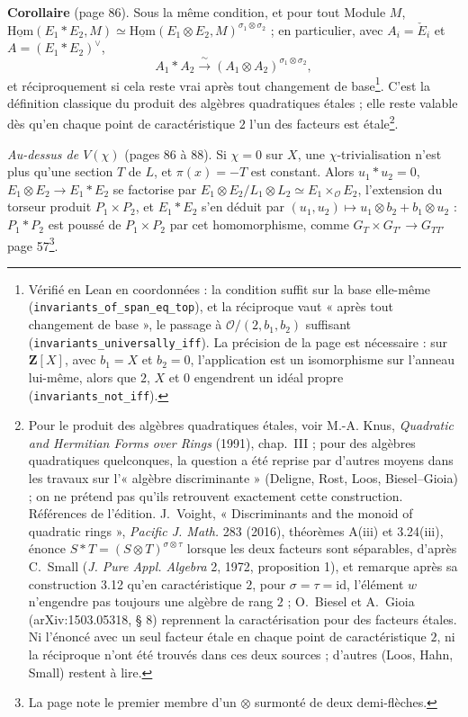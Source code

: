 \documentclass[11pt,a4paper]{article}
\begin{document}
\textbf{Corollaire} (page 86). Sous la même condition, et pour tout Module $M$,
$\underline{\mathrm{Hom}}(E_1 * E_2, M) \simeq \underline{\mathrm{Hom}}(E_1 \otimes
E_2, M)^{\sigma_1 \otimes \sigma_2}$ ; en particulier, avec $A_i = \check{E}_i$ et
$A = (E_1 * E_2)^{\vee}$,
\[
  A_1 * A_2 \xrightarrow{\ \sim\ } (A_1 \otimes A_2)^{\sigma_1 \otimes \sigma_2},
\]
et réciproquement si cela reste vrai après tout changement de base\footnote{Vérifié
en Lean en coordonnées : la condition suffit sur la base elle-même
(\texttt{invariants\_of\_span\_eq\_top}), et la réciproque vaut « après tout
changement de base », le passage à $\mathcal{O}/(2, b_1, b_2)$ suffisant
(\texttt{invariants\_universally\_iff}). La précision de la page est nécessaire :
sur $\mathbf{Z}[X]$, avec $b_1 = X$ et $b_2 = 0$, l'application est un isomorphisme
sur l'anneau lui-même, alors que $2$, $X$ et $0$ engendrent un idéal propre
(\texttt{invariants\_not\_iff}).}. C'est la
définition classique du produit des algèbres quadratiques étales ; elle reste
valable dès qu'en chaque point de caractéristique $2$ l'un des facteurs est
étale\footnote{Pour le produit des algèbres quadratiques étales, voir M.-A. Knus,
\emph{Quadratic and Hermitian Forms over Rings} (1991), chap.~III ; pour des algèbres
quadratiques quelconques, la question a été reprise par d'autres moyens dans les
travaux sur l'« algèbre discriminante » (Deligne, Rost, Loos, Biesel--Gioia) ;
on ne prétend pas qu'ils retrouvent exactement cette construction. Références de
l'édition. J.~Voight, « Discriminants and the monoid of quadratic rings »,
\emph{Pacific J. Math.} 283 (2016), théorèmes A(iii) et 3.24(iii), énonce
$S * T = (S \otimes T)^{\sigma \otimes \tau}$ lorsque les deux facteurs sont
séparables, d'après C.~Small (\emph{J. Pure Appl. Algebra} 2, 1972,
proposition 1), et remarque après sa construction 3.12 qu'en caractéristique $2$,
pour $\sigma = \tau = \mathrm{id}$, l'élément $w$ n'engendre pas toujours une
algèbre de rang $2$ ; O.~Biesel et A.~Gioia (arXiv:1503.05318, § 8) reprennent la
caractérisation pour des facteurs étales. Ni l'énoncé avec un seul facteur
étale en chaque point de caractéristique $2$, ni la réciproque n'ont été trouvés
dans ces deux sources ; d'autres (Loos, Hahn, Small) restent à lire.}.

\emph{Au-dessus de $V(\chi)$} (pages 86 à 88). Si $\chi = 0$ sur $X$, une
$\chi$-trivialisation n'est plus qu'une section $T$ de $L$, et $\pi(x) = -T$ est
constant. Alors $u_1 * u_2 = 0$, $E_1 \otimes E_2 \to E_1 * E_2$ se factorise par
$E_1 \otimes E_2/L_1 \otimes L_2 \simeq E_1 \times_{\mathcal{O}} E_2$, l'extension du torseur
produit $P_1 \times P_2$, et $E_1 * E_2$ s'en déduit par $(u_1, u_2) \mapsto u_1 \otimes b_2
+ b_1 \otimes u_2$ : $P_1 * P_2$ est poussé de $P_1 \times P_2$ par cet homomorphisme,
comme $G_T \times G_{T'} \to G_{TT'}$ page 57\footnote{La page note le premier membre
d'un $\otimes$ surmonté de deux demi-flèches.}.
\end{document}
